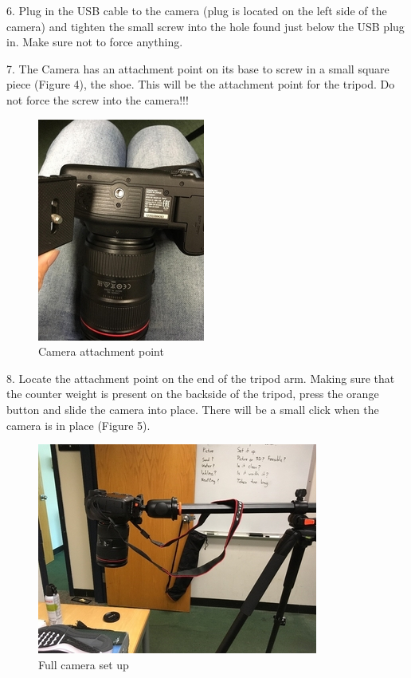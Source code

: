 6.	Plug in the USB cable to the camera (plug is located on the left side of the camera) and tighten the small screw into the hole found just below the USB plug in. Make sure not to force anything. 

7.	The Camera has an attachment point on its base to screw in a small square piece (Figure 4), the shoe. This will be the attachment point for the tripod. Do not force the screw into the camera!!!

\begin{figure}[!htp]
\centering
\includegraphics[scale=2]{Camera__2_}
\caption{Camera attachment point}
\label{img:Image 4}
\end{figure}

\newpage

8. Locate the attachment point on the end of the tripod arm. Making sure that the counter weight is present on the backside of the tripod, press the orange button and slide the camera into place. There will be a small click when the camera is in place (Figure 5). 

\begin{figure}[!htp]
\centering
\includegraphics[scale=1.9]{Full_Set_Up}
\caption{Full camera set up}
\label{Image 5}
\end{figure}



